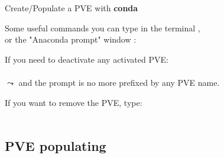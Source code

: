 \documentclass[10pt,serif,mathserif,compress,hyperref={colorlinks}]{beamer}
\begin{document}
\begin{frame}{Create/Populate a PVE with \textbf{conda}}

  \hspace*{-6mm}Some useful  commands you can type in the terminal ,\\
  \hspace*{-6mm}or the "Anaconda prompt" window \DarkGray{\footnotesize [Windows]}:
  
  \begin{tcolorbox}[title={\bf List all the conda PVEs}]
      \hspace*{10pt}
  \end{tcolorbox}

  \begin{tcolorbox}[title={\bf Deactivate a conda PVE}]
    If you need to deactivate any activated PVE:\\
      \hspace*{10pt}\\
  $\leadsto$ and the prompt is no more prefixed by any PVE name.
  \end{tcolorbox}

  \begin{tcolorbox}[title={\bf Remove a conda PVE}]
    If you want to remove the  PVE, type:\\
      \hspace*{10pt}  \\
      \hspace*{10pt}
  \end{tcolorbox}
\end{frame}

\subsection{PVE populating}
\end{document}
